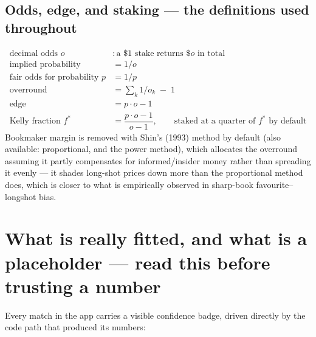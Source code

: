 \documentclass[11pt]{article}
\begin{document}
\subsection{Odds, edge, and staking --- the definitions used throughout}
\begin{align}
\text{decimal odds } o &: \text{a \$1 stake returns \$}o\text{ in total} \\
\text{implied probability} &= 1/o \\
\text{fair odds for probability } p &= 1/p \\
\text{overround} &= \textstyle\sum_k 1/o_k \;-\;1 \\
\text{edge} &= p\cdot o - 1 \\
\text{Kelly fraction } f^* &= \dfrac{p\cdot o - 1}{o - 1}, \qquad \text{staked at a quarter of }f^*\text{ by default}
\end{align}
Bookmaker margin is removed with Shin's (1993) method by default (also available: proportional,
and the power method), which allocates the overround assuming it partly compensates for
informed/insider money rather than spreading it evenly --- it shades long-shot prices down more
than the proportional method does, which is closer to what is empirically observed in
sharp-book favourite--longshot bias.

\section{What is really fitted, and what is a placeholder --- read this before trusting a number}
\label{sec:honesty}
Every match in the app carries a visible confidence badge, driven directly by the code path that
produced its numbers:
\end{document}
